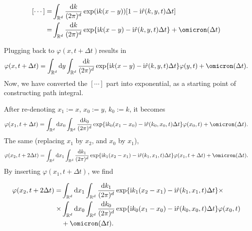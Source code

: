 \documentclass{book}
\newcommand{\assign}{:=}
\newcommand{\mathd}{\mathrm{d}}
\newcommand{\mathi}{\mathrm{i}}
\newcommand{\mathpi}{\pi}
\begin{document}
\begin{align}
  {}[\cdots] = & \int_{\mathbb{R}^d} \frac{\mathd k}{(2 \mathpi)^d} \exp
  (\mathi k (x - y))  [1 - \mathi {\color[HTML]{000000}\hat{r} (k, y, t)}
  \Delta t] \nonumber\\
  = & \int_{\mathbb{R}^d} \frac{\mathd k}{(2 \mathpi)^d} \exp \{\mathi k (x -
  y) - \mathi {\color[HTML]{000000}\hat{r} (k, y, t)} \Delta t\} + \omicron
  (\Delta t) \nonumber
\end{align}

Plugging back to $\varphi (x, t + \Delta t)$results in
\[ \varphi (x, t + \Delta t) = \int_{\mathbb{R}^d} \mathd y
   \int_{\mathbb{R}^d} \frac{\mathd k}{(2 \mathpi)^d} \exp \{\mathi k (x - y)
   - \mathi {\color[HTML]{000000}\hat{r} (k, y, t)} \Delta t\} \varphi (y, t)
   + \omicron (\Delta t) . \]
Now, we have converted the $[\cdots]$ part into exponential, as a starting
point of constructing path integral.

After re-denoting $x_1 \assign x$, $x_0 \assign y$, $k_0 \assign k$, it
becomes
\[ \varphi (x_1, t + \Delta t) = \int_{\mathbb{R}^d} \mathd x_0 
   \int_{\mathbb{R}^d} \frac{\mathd k_0}{(2 \mathpi)^d} \exp \{\mathi k_0 (x_1
   - x_0) - \mathi {\color[HTML]{000000}\hat{r} (k_0, x_0, t)} \Delta t\}
   \varphi (x_0, t) + \omicron (\Delta t) . \]
The same (replacing $x_1$ by $x_2$, and $x_0$ by $x_1$),
\[ \varphi (x_2, t + 2 \Delta t) = \int_{\mathbb{R}^d} \mathd x_1 
   \int_{\mathbb{R}^d} \frac{\mathd k_1}{(2 \mathpi)^d} \exp \{\mathi k_1 (x_2
   - x_1) - \mathi {\color[HTML]{000000}\hat{r} (k_1, x_1, t)} \Delta t\}
   \varphi (x_1, t + \Delta t) + \omicron (\Delta t) . \]
By inserting $\varphi (x_1, t + \Delta t)$, we find

\begin{align}
  \varphi (x_2, t + 2 \Delta t) = & \int_{\mathbb{R}^d} \mathd x_1 
  \int_{\mathbb{R}^d} \frac{\mathd k_1}{(2 \mathpi)^d} \exp \{\mathi k_1 (x_2
  - x_1) - \mathi {\color[HTML]{000000}\hat{r} (k_1, x_1, t)} \Delta t\}
  \times \nonumber\\
  \times & \int_{\mathbb{R}^d} \mathd x_0  \int_{\mathbb{R}^d} \frac{\mathd
  k_0}{(2 \mathpi)^d} \exp \{\mathi k_0 (x_1 - x_0) - \mathi
  {\color[HTML]{000000}\hat{r} (k_0, x_0, t)} \Delta t\} \varphi (x_0, t)
  \nonumber\\
  & + \omicron (\Delta t) . \nonumber
\end{align}
\end{document}
